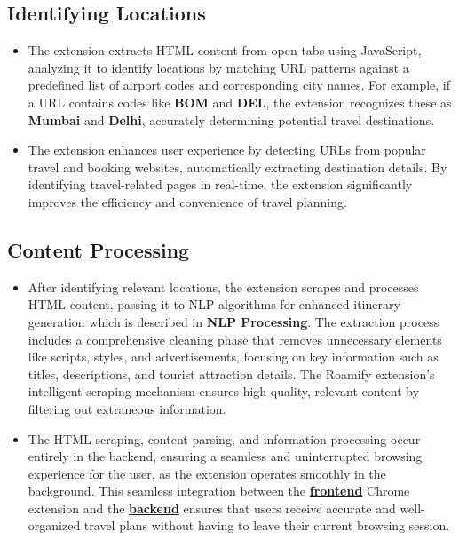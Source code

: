 \documentclass[conference]{IEEEtran}
\begin{document}
    \subsection{Identifying Locations}
        \begin{itemize}
            \item The extension extracts HTML content from open tabs using JavaScript, analyzing it to identify locations by matching URL patterns against a predefined list of airport codes and corresponding city names. For example, if a URL contains codes like \textbf{BOM} and \textbf{DEL}, the extension recognizes these as \textbf{Mumbai} and \textbf{Delhi}, accurately determining potential travel destinations.

            \item The extension enhances user experience by detecting URLs from popular travel and booking websites, automatically extracting destination details. By identifying travel-related pages in real-time, the extension significantly improves the efficiency and convenience of travel planning.

        \end{itemize}

    \subsection{Content Processing}
        \begin{itemize}
            \item After identifying relevant locations, the extension scrapes and processes HTML content, passing it to NLP algorithms for enhanced itinerary generation which is described in \textbf{NLP Processing}. The extraction process includes a comprehensive cleaning phase that removes unnecessary elements like scripts, styles, and advertisements, focusing on key information such as titles, descriptions, and tourist attraction details. The Roamify extension's intelligent scraping mechanism ensures high-quality, relevant content by filtering out extraneous information.

            \item The HTML scraping, content parsing, and information processing occur entirely in the backend, ensuring a seamless and uninterrupted browsing experience for the user, as the extension operates smoothly in the background. This seamless integration between the \href{https://github.com/Roamify-Research/Extension/tree/main/src}{\textbf{frontend}} Chrome extension and the \href{https://github.com/Roamify-Research/Extension/tree/main/backend}{\textbf{backend}} ensures that users receive accurate and well-organized travel plans without having to leave their current browsing session.

        \end{itemize}
\end{document}

